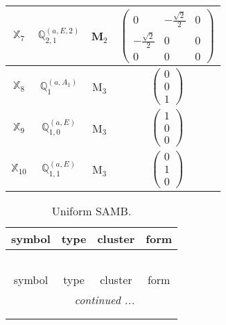 \documentclass[fleqn,10pt,landscape]{article}
\begin{document}
\begin{itemize}
\begin{center}
\begin{longtable}{c|c|c|c}
$ \mathbb{X}_{7} $ & $\mathbb{Q}_{2,1}^{(a,E,2)}$ & M$_{2}$ & $\begin{pmatrix} 0 & - \frac{\sqrt{2}}{2} & 0 \\ - \frac{\sqrt{2}}{2} & 0 & 0 \\ 0 & 0 & 0 \end{pmatrix}$ \\ \hline
$ \mathbb{X}_{8} $ & $\mathbb{Q}_{1}^{(a,A_{1})}$ & M$_{3}$ & $\begin{pmatrix} 0 \\ 0 \\ 1 \end{pmatrix}$ \\
$ \mathbb{X}_{9} $ & $\mathbb{Q}_{1,0}^{(a,E)}$ & M$_{3}$ & $\begin{pmatrix} 1 \\ 0 \\ 0 \end{pmatrix}$ \\
$ \mathbb{X}_{10} $ & $\mathbb{Q}_{1,1}^{(a,E)}$ & M$_{3}$ & $\begin{pmatrix} 0 \\ 1 \\ 0 \end{pmatrix}$ \\
\end{longtable}
\end{center}
\begin{center}
\renewcommand{\arraystretch}{1.3}
\begin{longtable}{c|c|c|c}
\caption{Uniform SAMB.}
 \\
 \hline \hline
symbol & type & cluster & form \\ \hline \endfirsthead

\multicolumn{3}{l}{\tablename\ \thetable{}} \\
 \hline \hline
symbol & type & cluster & form \\ \hline \endhead

 \hline \hline
\multicolumn{3}{r}{\footnotesize\it continued ...} \\ \endfoot

 \hline \hline
\multicolumn{3}{r}{} \\ \endlastfoot


\end{longtable}
\end{center}
\end{itemize}
\end{document}
